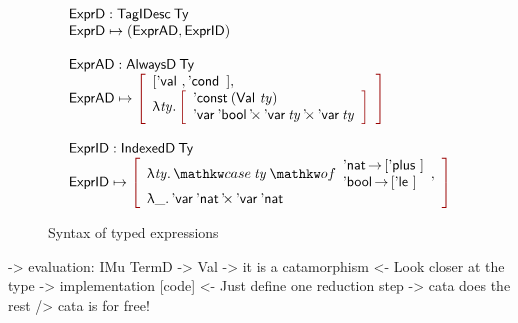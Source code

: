 \begin{figure}

\[\stk{
\stk{
\HExprD : \TagIDesc{\Ty} \\
\HExprD \mapsto ( \HExprAD , \HExprID ) \\
} \\
\\
\stk{
\HExprAD : \ATagIDesc{\Ty} \\
\HExprAD \mapsto \bigRedBracket{
                 \begin{array}{l}
                   {[\Eval{}, \Econd{\!}{\!}{\!}\!\,]} \red{,} \\
                   \LAM{\V{ty}}
                   \bigRedBracket{
                   \begin{array}{l}
                   \DConst{(\Val{\V{ty}})} \\
                   \DProd{\DVar{\Ebool}}{\DProd{\DVar{\V{ty}}}{\DVar{\V{ty}}}}
                   \end{array}
                   }
                 \end{array}
                 }
\\
\\
} 
\\
\stk{
\HExprID : \ITagIDesc{\Ty} \\
\HExprID \mapsto \bigRedBracket{
                 \begin{array}{l}
                   \LAM{\V{ty}} \case{\V{ty}}{\Enat \To {[\Eplus{\!}{\!}\!\,]} \\ \Ebool \To {[\Ele{\!}{\!}\!\,]}} \red{,} \\
                   \LAM{\_} \DProd{\DVar{\Enat}}{\DVar{\Enat}} 
                   \end{array}
                   }
}
}\]

\caption{Syntax of typed expressions}
\label{fig:hexpr-full}

\end{figure}

\begin{wstructure}
    -> evaluation: IMu TermD -> Val
        -> it is a catamorphism
            <- Look closer at the type
        -> implementation [code]
            <- Just define one reduction step
            -> cata does the rest
                /> cata is for free!
\end{wstructure}

\newcommand{\evalH}{\F{eval}_{\green{\Downarrow}}}
\newcommand{\evalOne}{\F{eval}_{\green{\downarrow}}}


